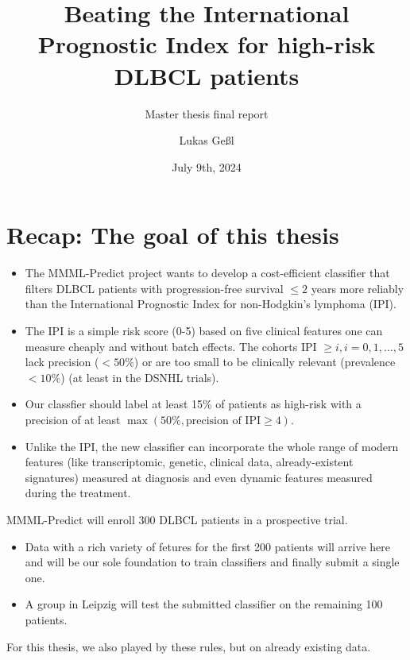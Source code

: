 \documentclass[10pt, aspectratio=169]{beamer}
\title{Beating the International Prognostic Index for high-risk DLBCL patients}
\subtitle{Master thesis final report}
\date{July 9th, 2024}
\author{Lukas Geßl}
\institute{Chair of Statistical Bioinformatics, Regensburg University}
\begin{document}
\maketitle

\section{Recap: The goal of this thesis}

\begin{frame}{}
  \begin{itemize}
    \item The MMML-Predict project wants to develop a cost-efficient classifier 
    that filters DLBCL patients with progression-free survival $\leq 2$ years more reliably 
    than the International Prognostic Index for non-Hodgkin's lymphoma (IPI).
    \pause
    \item The IPI \cite{ipi93} is a simple risk score (0-5) based on five clinical features one can
    measure cheaply and without batch effects. The cohorts IPI $\geq i, i = 0, 1, \ldots, 5$
    lack precision ($< 50 \%$) or are too small to be clinically relevant
    (prevalence $< 10 \%$) (at least in the DSNHL trials).
    \item Our classfier should label at least 15\% of patients as high-risk with a precision
    of at least $\max(50\%, \text{precision of IPI} \geq 4)$.
    \pause
    \item Unlike the IPI, the new classifier can incorporate the whole range of 
    modern features (like transcriptomic, genetic, clinical data, already-existent 
    signatures) measured at diagnosis and even dynamic features measured during 
    the treatment.
  \end{itemize}
\end{frame}

\begin{frame}
  MMML-Predict will enroll 300 DLBCL patients in a prospective trial.
  \begin{itemize}
    \item Data with a rich variety of fetures for the first 200 patients will 
      arrive here and will be our sole foundation to train classifiers and 
      finally submit a single one.
    \item A group in Leipzig will test the submitted classifier on the remaining 
      100 patients.
  \end{itemize}
  \pause
  For this thesis, we also played by these rules, but on already existing data.
\end{frame}
\end{document}
